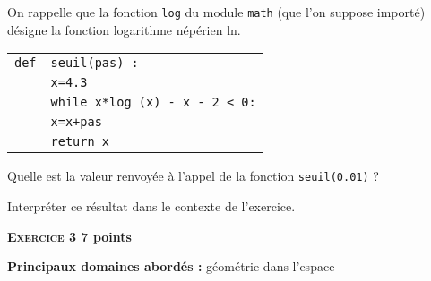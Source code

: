 \documentclass[10pt,a4paper]{article}
\begin{document}
\begin{enumerate}
On rappelle que la fonction \texttt{log} du module \texttt{math} (que l'on suppose importé)
désigne la fonction logarithme népérien ln.

\begin{center}
\begin{tabular}{|l l|} \hline
\texttt{def}& \texttt{seuil(pas) :}\\
&\texttt{x=4.3}\\
&\texttt{while x*log (x) - x - 2 < 0:}\\
&\quad \texttt{x=x+pas}\\
&\texttt{return x}\\ \hline
\end{tabular}
\end{center}

Quelle est la valeur renvoyée à l'appel de la fonction \texttt{seuil(0.01)} ?

Interpréter ce résultat dans le contexte de l'exercice.
\end{enumerate}

\bigskip

\textbf{\textsc{Exercice 3} \hfill 7 points}

\textbf{Principaux domaines abordés :} géométrie dans l'espace

\medskip
\end{document}

